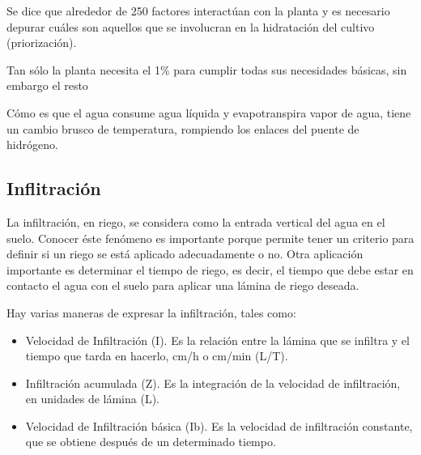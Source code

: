 Se dice que alrededor de 250 factores interactúan con la planta y es necesario depurar cuáles son aquellos que se involucran en la hidratación del cultivo (priorización).

Tan sólo la planta necesita el 1\% para cumplir todas sus necesidades básicas, sin embargo el resto 

Cómo es que el agua consume agua líquida y evapotranspira vapor de agua, tiene un cambio brusco de temperatura, rompiendo los enlaces del puente de hidrógeno.
\subsection{Inflitración}
La infiltración, en riego, se considera como la entrada vertical del agua en el suelo. Conocer éste fenómeno es importante porque permite tener un criterio para definir si un riego se está aplicado adecuadamente o no. Otra aplicación importante es determinar el tiempo de riego, es decir, el tiempo que debe estar en contacto el agua con el suelo para aplicar una lámina de riego deseada.

Hay varias maneras de expresar la infiltración, tales como:
\begin{itemize}
    \item Velocidad de Infiltración (I). Es la relación entre la lámina que se infiltra y el tiempo
    que tarda en hacerlo, cm/h o cm/min (L/T).
    \item Infiltración acumulada (Z). Es la integración de la velocidad de infiltración, en
    unidades de lámina (L).
    \item Velocidad de Infiltración básica (Ib). Es la velocidad de infiltración constante, que se
    obtiene después de un determinado tiempo.
\end{itemize}






